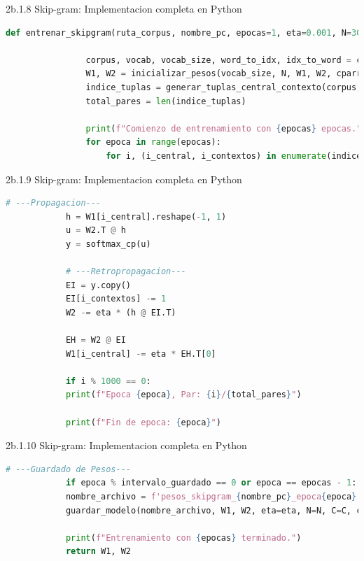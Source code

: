 \documentclass{beamer}
\begin{document}
\begin{frame}[fragile]{2b.1.8 Skip-gram: Implementacion completa en Python}
	
	\begin{block}{}
		\begin{lstlisting}[language=Python]
			def entrenar_skipgram(ruta_corpus, nombre_pc, epocas=1, eta=0.001, N=300, C=4, W1=None, W2=None, intervalo_guardado=50):
			
				corpus, vocab, vocab_size, word_to_idx, idx_to_word = cargar_corpus(ruta_corpus)
				W1, W2 = inicializar_pesos(vocab_size, N, W1, W2, cparray=True)
				indice_tuplas = generar_tuplas_central_contexto(corpus, word_to_idx, C)
				total_pares = len(indice_tuplas)
				
				print(f"Comienzo de entrenamiento con {epocas} epocas.")
				for epoca in range(epocas):
					for i, (i_central, i_contextos) in enumerate(indice_tuplas):              
		\end{lstlisting}
	\end{block}
\end{frame}

\begin{frame}[fragile]{2b.1.9 Skip-gram: Implementacion completa en Python}
	
	\begin{block}{}
		\begin{lstlisting}[language=Python]
			# ---Propagacion---
			h = W1[i_central].reshape(-1, 1)
			u = W2.T @ h
			y = softmax_cp(u)
			
			# ---Retropropagacion---
			EI = y.copy()
			EI[i_contextos] -= 1
			W2 -= eta * (h @ EI.T)
			
			EH = W2 @ EI
			W1[i_central] -= eta * EH.T[0]
			
			if i % 1000 == 0:
			print(f"Epoca {epoca}, Par: {i}/{total_pares}")
			
			print(f"Fin de epoca: {epoca}")                
		\end{lstlisting}
	\end{block}
\end{frame}

\begin{frame}[fragile]{2b.1.10 Skip-gram: Implementacion completa en Python}
	
	\begin{block}{}
		\begin{lstlisting}[language=Python]
			# ---Guardado de Pesos---
			if epoca % intervalo_guardado == 0 or epoca == epocas - 1:
			nombre_archivo = f'pesos_skipgram_{nombre_pc}_epoca{epoca}.npz'
			guardar_modelo(nombre_archivo, W1, W2, eta=eta, N=N, C=C, cparray=True)
			
			print(f"Entrenamiento con {epocas} terminado.")
			return W1, W2                
		\end{lstlisting}
	\end{block}
\end{frame}
\end{document}
